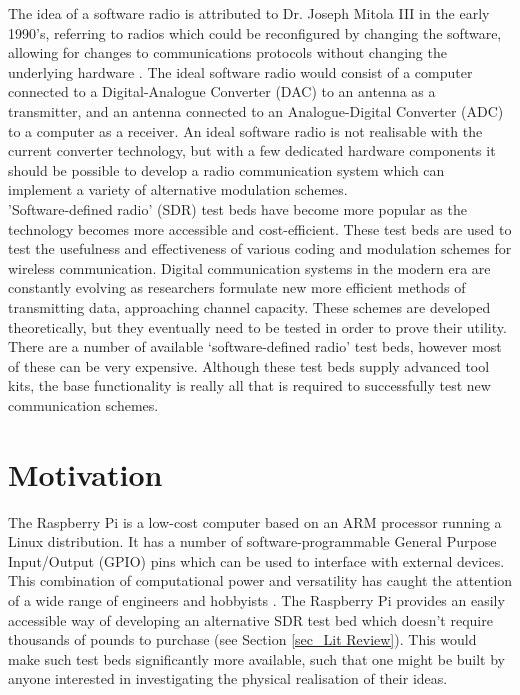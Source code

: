 \documentclass[../main.tex]{subfiles}
\begin{document}
The idea of a software radio is attributed to Dr. Joseph Mitola III in the early 1990's, referring to radios which could be reconfigured by changing the software, allowing for changes to communications protocols without changing the underlying hardware \cite{pap_SoftRadio}.
The ideal software radio would consist of a computer connected to a Digital-Analogue Converter (DAC) to an antenna as a transmitter, and an antenna connected to an Analogue-Digital Converter (ADC) to a computer as a receiver.
An ideal software radio is not realisable with the current converter technology, but with a few dedicated hardware components it should be possible to develop a radio communication system which can implement a variety of alternative modulation schemes.\\

'Software-defined radio' (SDR) test beds have become more popular as the technology becomes more accessible and cost-efficient.
These test beds are used to test the usefulness and effectiveness of various coding and modulation schemes for wireless communication.
Digital communication systems in the modern era are constantly evolving as researchers formulate new more efficient methods of transmitting data, approaching channel capacity.
These schemes are developed theoretically, but they eventually need to be tested in order to prove their utility.
There are a number of available ‘software-defined radio’ test beds, however most of these can be very expensive.
Although these test beds supply advanced tool kits, the base functionality is really all that is required to successfully test new communication schemes.\\



\section{Motivation}

The Raspberry Pi is a low-cost computer based on an ARM processor running a Linux distribution.
It has a number of software-programmable General Purpose Input/Output (GPIO) pins which can be used to interface with external devices.
This combination of computational power and versatility has  caught the attention of a wide range of engineers and hobbyists \cite{web_AboutPi}.
The Raspberry Pi provides an easily accessible way of developing an alternative SDR test bed which doesn't require thousands of pounds to purchase (see Section \ref{sec_Lit Review}).
This would make such test beds significantly more available, such that one might be built by anyone interested in investigating the physical realisation of their ideas.\\
\end{document}
